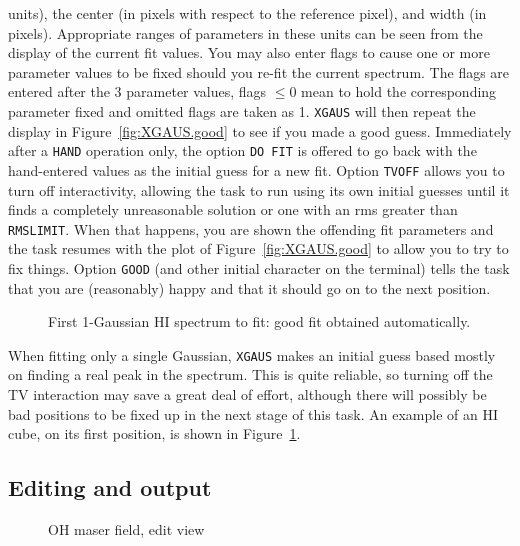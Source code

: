 \documentclass[twoside]{article}
\newcommand{\putfig}[1]{\texttt{[image: \#1.eps]}}
\begin{document}
units), the center (in pixels with respect to the reference pixel),
and width (in pixels).  Appropriate ranges of parameters in these
units can be seen from the display of the current fit values.  You may
also enter flags to cause one or more parameter values to be fixed
should you re-fit the current spectrum.  The flags are entered after
the 3 parameter values, flags $\leq 0$ mean to hold the corresponding
parameter fixed and omitted flags are taken as 1.  {\tt XGAUS} will
then repeat the display in Figure~\ref{fig:XGAUS.good} to see if you
made a good guess.  Immediately after a {\tt HAND} operation only, the
option {\tt DO FIT} is offered to go back with the hand-entered values
as the initial guess for a new fit.  Option {\tt TVOFF} allows you to
turn off interactivity, allowing the task to run using its own initial
guesses until it finds a completely unreasonable solution or one with
an rms greater than {\tt RMSLIMIT}\@.  When that happens, you are
shown the offending fit parameters and the task resumes with the plot
of Figure~\ref{fig:XGAUS.good} to allow you to try to fix things.
Option {\tt GOOD} (and other initial character on the terminal) tells
the task that you are (reasonably) happy and that it should go on to
the next position.

\begin{figure}
\begin{center}
\resizebox{6.0in}{!}{\putfig{XGAUS.HIgood}}
\caption{First 1-Gaussian HI spectrum to fit: good fit obtained
  automatically.}
\label{fig:XGAUS.HIgood}
\end{center}
\end{figure}

When fitting only a single Gaussian, {\tt XGAUS} makes an initial
guess based mostly on finding a real peak in the spectrum.  This is
quite reliable, so turning off the TV interaction may save a great
deal of effort, although there will possibly be bad positions to be
fixed up in the next stage of this task.  An example of an HI cube, on
its first position, is shown in Figure~\ref{fig:XGAUS.HIgood}.

\subsection{Editing and output}

\begin{figure}
\begin{center}
\resizebox{6.0in}{!}{\putfig{XGAUS.edit}}
\caption{OH maser field, edit view}
\label{fig:XGAUS.edit}
\end{center}
\end{figure}
\end{document}
